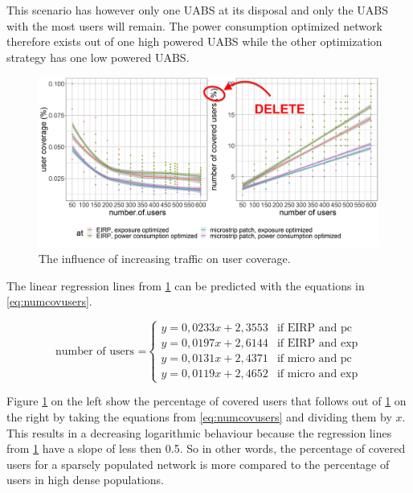 This scenario has however only one 
\gls{UABS} at its disposal and only the \gls{UABS} with the most users will remain. The power consumption optimized network therefore exists out of one high powered \gls{UABS} 
while the other optimization strategy has one low powered \gls{UABS}.

\begin{figure}[h!]
  \includegraphics[width=\textwidth]{../results/s2/uvsnumdronesAndCov.png}
  \caption{The influence of increasing traffic on user coverage.}
  \label{fig:s2uvsnumcovusers}
\end{figure}

The linear regression lines from \ref{fig:s2uvsnumcovusers} can be predicted with the equations in \ref{eq:numcovusers}.

\begin{equation}
\text{number of users =}
    \begin{cases}
      y = 0,0233x + 2,3553 & \text{if EIRP and pc}\\
      y = 0,0197x + 2,6144  & \text{if EIRP and exp}\\
      y = 0,0131x + 2,4371  & \text{if micro and pc}\\
      y = 0,0119x + 2,4652  & \text{if micro and exp}
    \end{cases} 
    \label{eq:numcovusers}      
\end{equation}

Figure \ref{fig:s2uvsnumcovusers} on the left show the percentage of covered users that follows out of \ref{fig:s2uvsnumcovusers} on the right by taking the equations from \ref{eq:numcovusers} and dividing them by $x$.
This results in a decreasing logarithmic behaviour because the regression lines from  \ref{fig:s2uvsnumcovusers} have a slope of less then 0.5.
So in other words, the  percentage of covered users for a sparsely populated network is more compared to the percentage of users in high dense populations.

